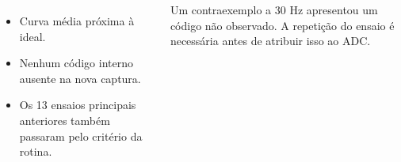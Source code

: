 \begin{columns}[T]
\begin{itemize}
\item Curva média próxima à ideal.
\item Nenhum código interno ausente na nova captura.
\item Os 13 ensaios principais anteriores também passaram pelo critério da rotina.
\end{itemize}
\small Um contraexemplo a 30 Hz apresentou um código não observado. A repetição do ensaio é necessária antes de atribuir isso ao ADC.
\end{columns}
